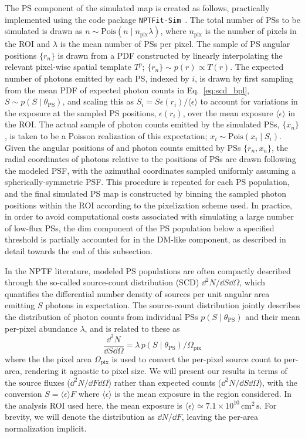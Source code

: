 \documentclass[prd,aps,10pt,nofootinbib,twocolumn,superscriptaddress,preprintnumbers,balancelastpage,longbibliography,floatfix]{revtex4-2}
\begin{document}
The PS component of the simulated \Fermi map is created as follows, practically implemented using the code package \texttt{NPTFit-Sim}~\cite{NPTFit-Sim}. The total number of PSs to be simulated is drawn as $n \sim \mathrm{Pois}(n\mid n_\mathrm{pix}\lambda)$, where $n_\mathrm{pix}$ is the number of pixels in the ROI and $\lambda$ is the mean number of PSs per pixel. The sample of PS angular positions $\{r_n\}$ is drawn from a PDF constructed by linearly interpolating the relevant pixel-wise spatial template $T^p$; $\{r_n\} \sim p(r) \propto T(r)$. The expected number of photons emitted by each PS, indexed by $i$, is drawn by first sampling from the mean PDF of expected photon counts in Eq.~\eqref{eq:scd_bpl}, $S \sim p\left({S}\mid\theta_\mathrm{PS}\right)$, and scaling this as ${S_i} = S \epsilon(r_i) / \langle \epsilon \rangle$ to account for variations in the \Fermi exposure at the sampled PS positions, $\epsilon(r_i)$, over the mean exposure $\langle \epsilon \rangle$ in the ROI. The actual sample of photon counts emitted by the simulated PSs, $\{x_n\}$, is taken to be a Poisson realization of this expectation; ${x_i} \sim \mathrm{Pois}\left({x_i}\mid {S_i}\right)$. Given the angular positions of and photon counts emitted by PSs $\{r_n, x_n\}$, the radial coordinates of photons relative to the positions of PSs are drawn following the modeled \Fermi PSF, with the azimuthal coordinates sampled uniformly assuming a spherically-symmetric PSF. This procedure is repeated for each PS population, and the final simulated PS map is constructed by binning the sampled photon positions within the ROI according to the pixelization scheme used. In practice, in order to avoid computational costs associated with simulating a large number of low-flux PSs, the dim component of the PS population below a specified threshold is partially accounted for in the DM-like component, as described in detail towards the end of this subsection.

In the NPTF literature, modeled PS populations are often compactly described through the so-called source-count distribution (SCD) $\dd^2 N /\dd S \dd\Omega$, which quantifies the differential number density of sources per unit angular area emitting $S$ photons in expectation. The source-count distribution jointly describes the distribution of photon counts from individual PSs $p(S\mid\theta_\mathrm{PS})$ and their mean per-pixel abundance $\lambda$, and is related to these as
\begin{equation}
\label{eq:scd_ps}
\frac{\dd^2 N}{\dd S\dd\Omega}=\lambda \, p(S\mid\theta_\mathrm{PS}) / \Omega_\mathrm{pix}
\end{equation}
where the the pixel area $\Omega_\mathrm{pix}$ is used to convert the per-pixel source count to per-area, rendering it agnostic to pixel size. We will present our results in terms of the source fluxes ($\dd^2 N /\dd F\dd\Omega$) rather than expected counts ($\dd^2 N /\dd S\dd\Omega$), with the conversion $S = \langle \epsilon \rangle F$ where $\langle \epsilon \rangle$ is the mean exposure in the region considered. In the analysis ROI used here, the mean exposure is $\langle \epsilon \rangle \simeq 7.1\times 10^{10}\,\mathrm{cm}^{2}\,\mathrm{s}$. For brevity, we will denote the distribution as $\dd N /\dd F$, leaving the per-area normalization implicit. 
\end{document}
